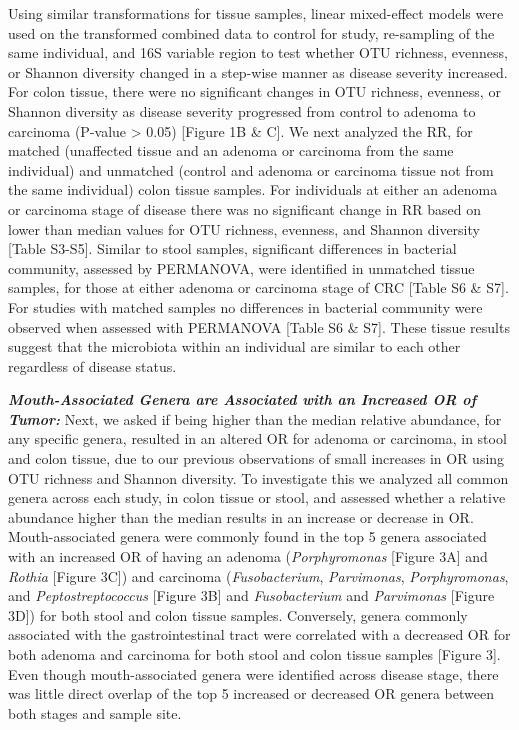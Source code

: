 \documentclass[12pt,]{article}
\begin{document}
Using similar transformations for tissue samples, linear mixed-effect
models were used on the transformed combined data to control for study,
re-sampling of the same individual, and 16S variable region to test
whether OTU richness, evenness, or Shannon diversity changed in a
step-wise manner as disease severity increased. For colon tissue, there
were no significant changes in OTU richness, evenness, or Shannon
diversity as disease severity progressed from control to adenoma to
carcinoma (P-value \textgreater{} 0.05) {[}Figure 1B \& C{]}. We next
analyzed the RR, for matched (unaffected tissue and an adenoma or
carcinoma from the same individual) and unmatched (control and adenoma
or carcinoma tissue not from the same individual) colon tissue samples.
For individuals at either an adenoma or carcinoma stage of disease there
was no significant change in RR based on lower than median values for
OTU richness, evenness, and Shannon diversity {[}Table S3-S5{]}. Similar
to stool samples, significant differences in bacterial community,
assessed by PERMANOVA, were identified in unmatched tissue samples, for
those at either adenoma or carcinoma stage of CRC {[}Table S6 \& S7{]}.
For studies with matched samples no differences in bacterial community
were observed when assessed with PERMANOVA {[}Table S6 \& S7{]}. These
tissue results suggest that the microbiota within an individual are
similar to each other regardless of disease status.

\textbf{\emph{Mouth-Associated Genera are Associated with an Increased
OR of Tumor:}} Next, we asked if being higher than the median relative
abundance, for any specific genera, resulted in an altered OR for
adenoma or carcinoma, in stool and colon tissue, due to our previous
observations of small increases in OR using OTU richness and Shannon
diversity. To investigate this we analyzed all common genera across each
study, in colon tissue or stool, and assessed whether a relative
abundance higher than the median results in an increase or decrease in
OR. Mouth-associated genera were commonly found in the top 5 genera
associated with an increased OR of having an adenoma
(\emph{Porphyromonas} {[}Figure 3A{]} and \emph{Rothia} {[}Figure 3C{]})
and carcinoma (\emph{Fusobacterium}, \emph{Parvimonas},
\emph{Porphyromonas}, and \emph{Peptostreptococcus} {[}Figure 3B{]} and
\emph{Fusobacterium} and \emph{Parvimonas} {[}Figure 3D{]}) for both
stool and colon tissue samples. Conversely, genera commonly associated
with the gastrointestinal tract were correlated with a decreased OR for
both adenoma and carcinoma for both stool and colon tissue samples
{[}Figure 3{]}. Even though mouth-associated genera were identified
across disease stage, there was little direct overlap of the top 5
increased or decreased OR genera between both stages and sample site.
\end{document}
